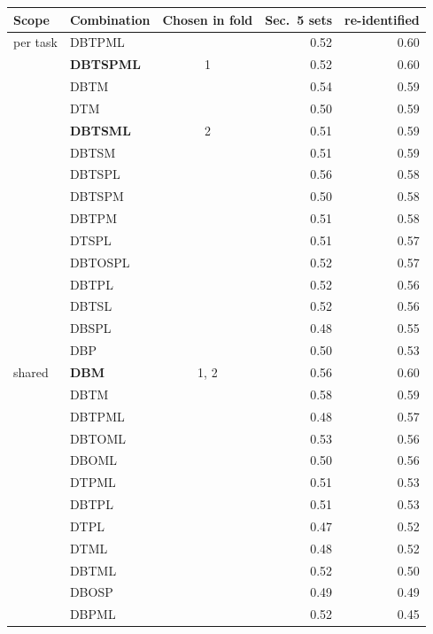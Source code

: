 \begin{tabular}{@{}llcrr@{}}
\toprule
Scope & Combination & Chosen in fold & Sec.~5 sets & re-identified \\
\midrule
per task & DBTPML &  & 0.52 & 0.60 \\
 & \textbf{DBTSPML} & 1 & 0.52 & 0.60 \\
 & DBTM &  & 0.54 & 0.59 \\
 & DTM &  & 0.50 & 0.59 \\
 & \textbf{DBTSML} & 2 & 0.51 & 0.59 \\
 & DBTSM &  & 0.51 & 0.59 \\
 & DBTSPL &  & 0.56 & 0.58 \\
 & DBTSPM &  & 0.50 & 0.58 \\
 & DBTPM &  & 0.51 & 0.58 \\
 & DTSPL &  & 0.51 & 0.57 \\
 & DBTOSPL &  & 0.52 & 0.57 \\
 & DBTPL &  & 0.52 & 0.56 \\
 & DBTSL &  & 0.52 & 0.56 \\
 & DBSPL &  & 0.48 & 0.55 \\
 & DBP &  & 0.50 & 0.53 \\
\midrule
shared & \textbf{DBM} & 1, 2 & 0.56 & 0.60 \\
 & DBTM &  & 0.58 & 0.59 \\
 & DBTPML &  & 0.48 & 0.57 \\
 & DBTOML &  & 0.53 & 0.56 \\
 & DBOML &  & 0.50 & 0.56 \\
 & DTPML &  & 0.51 & 0.53 \\
 & DBTPL &  & 0.51 & 0.53 \\
 & DTPL &  & 0.47 & 0.52 \\
 & DTML &  & 0.48 & 0.52 \\
 & DBTML &  & 0.52 & 0.50 \\
 & DBOSP &  & 0.49 & 0.49 \\
 & DBPML &  & 0.52 & 0.45 \\
\bottomrule
\end{tabular}
